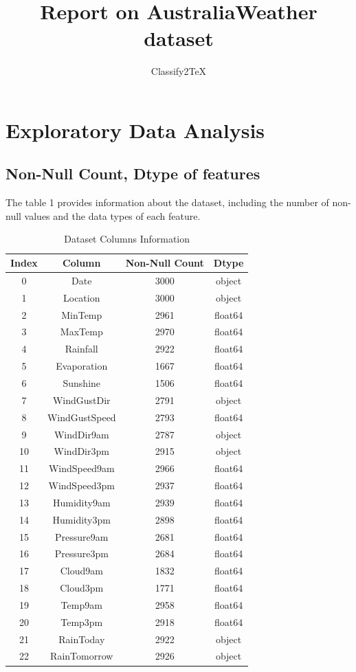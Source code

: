 \documentclass{article}%
\title{Report on AustraliaWeather dataset}%
\author{Classify2TeX}%
\begin{document}
%
\normalsize%
\maketitle%
\newpage%
\tableofcontents%
\newpage%
\section{Exploratory Data Analysis}%
\label{sec:ExploratoryDataAnalysis}%
\subsection{Non{-}Null Count, Dtype of features}%
\label{subsec:Non{-}NullCount,Dtypeoffeatures}%
The table 1 provides information about the dataset, including the number of non-null values and the data types of each feature.%


\begin{table}[h!]%
\caption{Dataset Columns Information}%
\vspace{0.2cm}%
\centering%
\begin{tabular}{|c||c||c||c|}%
\hline%
Index&Column&Non{-}Null Count&Dtype\\%
\hline%
0&Date&3000&object\\%
1&Location&3000&object\\%
2&MinTemp&2961&float64\\%
3&MaxTemp&2970&float64\\%
4&Rainfall&2922&float64\\%
5&Evaporation&1667&float64\\%
6&Sunshine&1506&float64\\%
7&WindGustDir&2791&object\\%
8&WindGustSpeed&2793&float64\\%
9&WindDir9am&2787&object\\%
10&WindDir3pm&2915&object\\%
11&WindSpeed9am&2966&float64\\%
12&WindSpeed3pm&2937&float64\\%
13&Humidity9am&2939&float64\\%
14&Humidity3pm&2898&float64\\%
15&Pressure9am&2681&float64\\%
16&Pressure3pm&2684&float64\\%
17&Cloud9am&1832&float64\\%
18&Cloud3pm&1771&float64\\%
19&Temp9am&2958&float64\\%
20&Temp3pm&2918&float64\\%
21&RainToday&2922&object\\%
22&RainTomorrow&2926&object\\%
\hline%
\end{tabular}%
\end{table}
\end{document}

